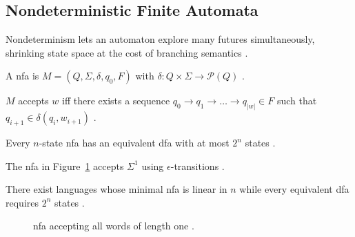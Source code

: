 \subsection{Nondeterministic Finite Automata}\label{subsec:nfa}

Nondeterminism lets an automaton explore many futures simultaneously,
shrinking state space at the cost of branching semantics
\cite{RabinScott1959}.

\begin{definition}\label{def:nfa}
A \gls{nfa} is $M=(Q,\Sigma,\delta,q_{0},F)$ with
$\delta\colon Q{\times}\Sigma\to\mathcal{P}(Q)$
\cite{RabinScott1959}.
\end{definition}

\begin{lemma}\label{lem:nfa-accept}
$M$ accepts $w$ iff there exists a sequence
$q_{0}\to q_{1}\to\dots\to q_{|w|}\in F$ such that
$q_{i+1}\in\delta(q_{i},w_{i+1})$
\cite{HopcroftUllman1979}.
\end{lemma}

\begin{theorem}\label{thm:subset}
Every \(n\)-state \gls{nfa} has an equivalent \gls{dfa}
with at most \(2^{n}\) states
\cite{RabinScott1959}.
\end{theorem}

\begin{example}\label{ex:nfa-length1}
The \gls{nfa} in Figure~\ref{fig:nfa-figure} accepts
$\Sigma^{1}$ using $\epsilon$-transitions
\cite{RabinScott1959}.
\end{example}

\begin{observation}[Succinctness]\label{obs:nfa-size}
There exist languages whose minimal \gls{nfa} is linear in $n$ while
every equivalent \gls{dfa} requires $2^{n}$ states
\cite{AhoHopcroftUllman1974}.
\end{observation}

\begin{figure}[H]
    \centering
    \caption{\gls{nfa} accepting all words of length one
    \cite{RabinScott1959}.}
    \label{fig:nfa-figure}
\end{figure}

